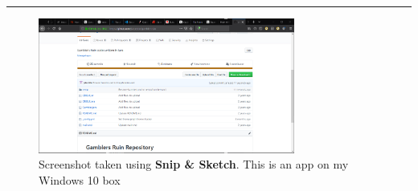 \documentclass[10pt,fleqn]{article}
\begin{document}
\vskip0.1in\hrule\vskip0.1in
\vfill
\begin{figure}[h]
\centering
\includegraphics[width=0.75\textwidth]{../images/github_13.png}
\caption{{Screenshot} taken using {\bf Snip \& Sketch}. This is an app on
         my Windows 10 box}
\end{figure}
\eject
\end{document}
